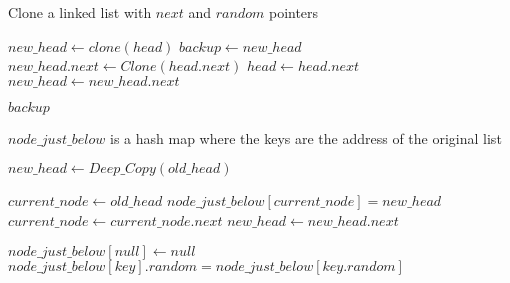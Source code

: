 \documentclass[12pt]{article}
\begin{document}
\begin{algorithm}

  \caption{Clone a linked list with $next$ and $random$ pointers}
  \begin{algorithmic}[1]
    
        \State $new\_head \gets clone(head)$
        \State $backup \gets new\_head$
            \State $new\_head.next \gets Clone(head.next)$
            \State $head \gets head.next$
            \State $new\_head \gets new\_head.next$
        \EndWhile
        
        \State \Return $backup$
    \EndProcedure
    
    \Statex
        \LeftComment $node\_just\_below$ is a hash map where the keys are the address of the original list 
        
        \Statex
            \State \Return{}
        \EndIf
        
        \Statex
        \State $new\_head \gets Deep\_Copy(old\_head)$ 
        
        \State $current\_node \gets old\_head$
            \State $node\_just\_below[current\_node] = new\_head$ 
            \State $current\_node \gets current\_node.next$
            \State $new\_head \gets new\_head.next$
        \EndWhile
        
        \Statex
       
        \State $node\_just\_below[null] \gets null$
          
                \State $node\_just\_below[key].random = node\_just\_below[key.random]$ 
            \EndIf
        \EndFor
        
        \State {}
    \EndFunction
  \end{algorithmic}
  
\end{algorithm}
\end{document}
